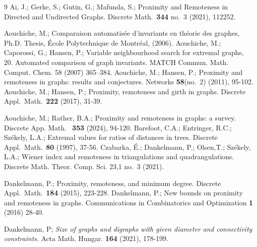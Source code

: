 \documentclass[a4paper,11pt]{article}
\begin{document}
\begin{thebibliography}{9}
 Ai, J.; Gerke, S.; Gutin, G.; Mafunda, S.; 
     Proximity and Remoteness in Directed and Undirected Graphs. 
     Discrete Math.\ {\bf 344} no.\ 3 (2021), 112252. 
     
 Aouchiche, M.; 
     Comparaison automatis\'{e}e d’invariants en th\'{e}orie des graphes, Ph.D. Thesis, 
     \'{E}cole Polytechnique de Montr\'{e}al, (2006). 
 Aouchiche, M.; Caporossi, G.; Hansen, P.;
     Variable neighbourhood search for extremal graphs, 20. Automated comparison
     of graph invariants. MATCH Commun. Math. Comput. Chem. 58 (2007) 365–384.
 Aouchiche, M.; Hansen, P.;
     Proximity and remoteness in graphs: results and conjectures.
     Networks {\bf 58}(no.\ 2) (2011), 95-102.
 Aouchiche, M.; Hansen, P.;
         Proximity, remoteness and girth in graphs. 
         Discrete Appl.\ Math.\ {\bf 222} (2017), 31-39. 
         
 Aouchiche, M.; Rather, B.A.;  
     Proximity and remoteness in graphs: a survey. 
     Discrete App. Math. \ {\bf 353} (2024), 94-120.
 Barefoot, C.A.; Entringer, R.C.; Sz\'{e}kely, L.A.;
     Extremal values for ratios of distances in trees.
     Discrete Appl.\ Math.\ {\bf 80} (1997), 37-56.
 Czabarka, \'{E}.; Dankelmann, P.; Olsen,T.; Sz\'{e}kely, L.A.;  
     Wiener index and remoteness in triangulations and quadrangulations. Discrete Math. Theor. Comp. Sci. 23,1 no.\ 3 (2021). 
    
 Dankelmann, P.; 
         Proximity, remoteness, and minimum degree. 
         Discrete Appl.\ Math.\ {\bf 184} (2015), 223-228.    
 Dankelmann, P.; 
     New bounds on proximity and remoteness in graphs. 
     Communications in Combinatorics and Optimization {\bf 1} (2016) 28-40.  
     
      Dankelmann, P;  \textit{Size of graphs and digraphs with given diameter and connectivity constraints.} Acta Math. Hungar. {\bf 164} (2021), 178-199.   
    

\end{thebibliography}
\end{document}
